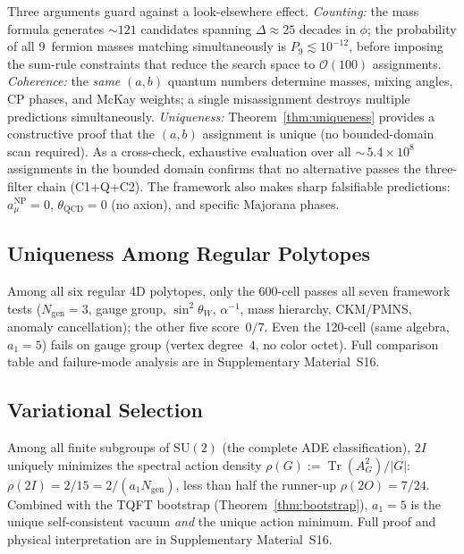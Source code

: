 \documentclass[12pt,a4paper]{article}
\theoremstyle{definition}
\begin{document}
Three arguments guard against a look-elsewhere effect.  \emph{Counting:}  the mass formula generates $\sim\!121$ candidates spanning $\Delta \approx 25$ decades in $\phi$; the probability of all 9~fermion masses matching simultaneously is $P_9 \lesssim 10^{-12}$, before imposing the sum-rule constraints that reduce the search space to $\mathcal{O}(100)$ assignments.  \emph{Coherence:}  the \emph{same} $(a,b)$ quantum numbers determine masses, mixing angles, CP phases, and McKay weights; a single misassignment destroys multiple predictions simultaneously.  \emph{Uniqueness:}  Theorem~\ref{thm:uniqueness} provides a constructive proof that the $(a,b)$ assignment is unique (no bounded-domain scan required).  As a cross-check, exhaustive evaluation over all ${\sim}\,5.4 \times 10^8$ assignments in the bounded domain confirms that no alternative passes the three-filter chain (C1+Q+C2).  The framework also makes sharp falsifiable predictions: $a_\mu^{\text{NP}} = 0$, $\theta_{\text{QCD}} = 0$ (no axion), and specific Majorana phases.

\subsection{Uniqueness Among Regular Polytopes}
\label{sec:uniqueness_polytopes}

Among all six regular 4D polytopes, only the 600-cell passes all seven framework tests ($N_{\text{gen}} = 3$, gauge group, $\sin^2\theta_W$, $\alpha^{-1}$, mass hierarchy, CKM/PMNS, anomaly cancellation); the other five score~$0/7$.  Even the 120-cell (same algebra, $a_1 = 5$) fails on gauge group (vertex degree~$4$, no color octet).  Full comparison table and failure-mode analysis are in Supplementary Material~S16.

\subsection{Variational Selection}
\label{sec:ade_variational}

Among all finite subgroups of $\mathrm{SU}(2)$ (the complete ADE classification), $2I$ uniquely minimizes the spectral action density $\rho(G) := \operatorname{Tr}(A_G^2)/|G|$: $\rho(2I) = 2/15 = 2/(a_1 N_{\text{gen}})$, less than half the runner-up $\rho(2O) = 7/24$.  Combined with the TQFT bootstrap (Theorem~\ref{thm:bootstrap}), $a_1 = 5$ is the unique self-consistent vacuum \emph{and} the unique action minimum.  Full proof and physical interpretation are in Supplementary Material~S16.
\end{document}
